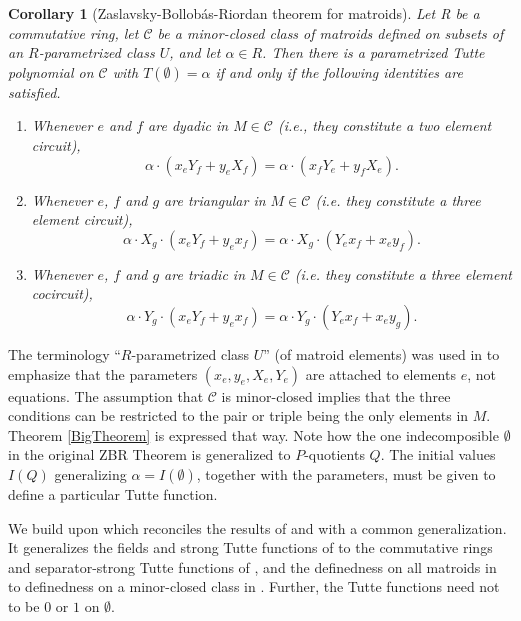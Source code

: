 \documentclass[12pt,leqno]{amsart}
\newtheorem{cor}[lem]{Corollary}
\theoremstyle{remark}
\begin{document}
\begin{cor}[Zaslavsky-Bollob\'{a}s-Riordan theorem for matroids\cite{Ellis-Monaghan-Traldi}]
\label{ZBRmatroids}
Let R
be a commutative ring, let $\mathcal{C}$ be a minor-closed class of matroids 
defined on subsets of an $R$-parametrized class $U$, and let 
$\alpha\in R$. 
Then there is a parametrized Tutte polynomial on
$\mathcal{C}$
with $T(\emptyset)=\alpha$ if and only if the following identities are 
satisfied.
\begin{enumerate}
\item[a]
Whenever $e$ and $f$ are dyadic in $M\in\mathcal{C}$ 
(i.e., they constitute a two element circuit),
\[
\alpha\cdot(x_e Y_f + y_e X_f) = \alpha\cdot (x_f Y_e + y_f X_e ).
\]
\item[b]
Whenever $e$, $f$ and $g$ are triangular in $M\in\mathcal{C}$ 
(i.e. they constitute a three element circuit),
\[
\alpha\cdot  X_g\cdot (x_e Y_f + y_e x_f) = 
\alpha\cdot  X_g\cdot (Y_e x_f + x_e y_f ).
\]
\item[c]
Whenever $e$, $f$ and $g$ are triadic in $M\in\mathcal{C}$ 
(i.e. they constitute a three element cocircuit),
\[
\alpha\cdot Y_g\cdot  (x_e Y_f + y_e x_f) = 
\alpha\cdot Y_g \cdot (Y_e x_f + x_e y_g ).
\]
\end{enumerate}
\end{cor}

The terminology ``$R$-parametrized class $U$'' (of matroid elements)
was used in \cite{Ellis-Monaghan-Traldi} to emphasize that the parameters
$(x_e,y_e,X_e,Y_e)$ are attached to elements $e$, not equations.  
The assumption that $\mathcal{C}$ is minor-closed implies that the 
three conditions can be restricted to the pair or triple being the
only elements in $M$.  Theorem \ref{BigTheorem} 
is expressed that way.  Note how the one indecomposible $\emptyset$
in the original ZBR Theorem is generalized to $P$-quotients $Q$.
The initial values $I(Q)$ generalizing
$\alpha=I(\emptyset)$, together with the parameters, 
must be given to define a particular Tutte function.

We build upon \cite{Ellis-Monaghan-Traldi} which reconciles
the results of \cite{MR93a:05047} and 
\cite{BollobasRiordanTuttePolyColored} with a common generalization.  
It generalizes the fields and strong Tutte functions of \cite{MR93a:05047}
to the commutative rings and separator-strong Tutte functions of 
\cite{BollobasRiordanTuttePolyColored}, and the definedness on 
all matroids in \cite{BollobasRiordanTuttePolyColored} to definedness
on a minor-closed class in \cite{MR93a:05047}.  Further, the
Tutte functions need not to be $0$ or $1$ on $\emptyset$.
\end{document}
